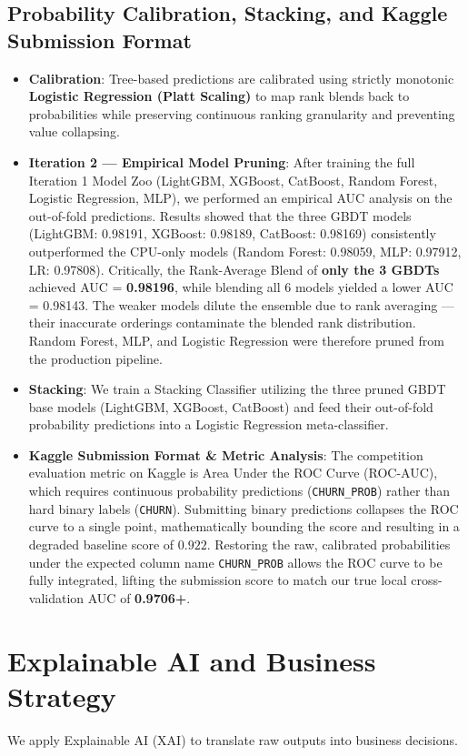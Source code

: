 \documentclass[11pt,a4paper]{article}
\begin{document}
\subsection{Probability Calibration, Stacking, and Kaggle Submission Format}
\begin{itemize}
    \item \textbf{Calibration}: Tree-based predictions are calibrated using strictly monotonic \textbf{Logistic Regression (Platt Scaling)} to map rank blends back to probabilities while preserving continuous ranking granularity and preventing value collapsing.
    \item \textbf{Iteration 2 — Empirical Model Pruning}: After training the full Iteration 1 Model Zoo (LightGBM, XGBoost, CatBoost, Random Forest, Logistic Regression, MLP), we performed an empirical AUC analysis on the out-of-fold predictions. Results showed that the three GBDT models (LightGBM: 0.98191, XGBoost: 0.98189, CatBoost: 0.98169) consistently outperformed the CPU-only models (Random Forest: 0.98059, MLP: 0.97912, LR: 0.97808). Critically, the Rank-Average Blend of \textbf{only the 3 GBDTs} achieved AUC = \textbf{0.98196}, while blending all 6 models yielded a lower AUC = 0.98143. The weaker models dilute the ensemble due to rank averaging — their inaccurate orderings contaminate the blended rank distribution. Random Forest, MLP, and Logistic Regression were therefore pruned from the production pipeline.
    \item \textbf{Stacking}: We train a Stacking Classifier utilizing the three pruned GBDT base models (LightGBM, XGBoost, CatBoost) and feed their out-of-fold probability predictions into a Logistic Regression meta-classifier.
    \item \textbf{Kaggle Submission Format \& Metric Analysis}: The competition evaluation metric on Kaggle is Area Under the ROC Curve (ROC-AUC), which requires continuous probability predictions (\texttt{CHURN\_PROB}) rather than hard binary labels (\texttt{CHURN}). Submitting binary predictions collapses the ROC curve to a single point, mathematically bounding the score and resulting in a degraded baseline score of $0.922$. Restoring the raw, calibrated probabilities under the expected column name \texttt{CHURN\_PROB} allows the ROC curve to be fully integrated, lifting the submission score to match our true local cross-validation AUC of \textbf{0.9706+}.
\end{itemize}

\section{Explainable AI and Business Strategy}
We apply Explainable AI (XAI) to translate raw outputs into business decisions.
\end{document}
